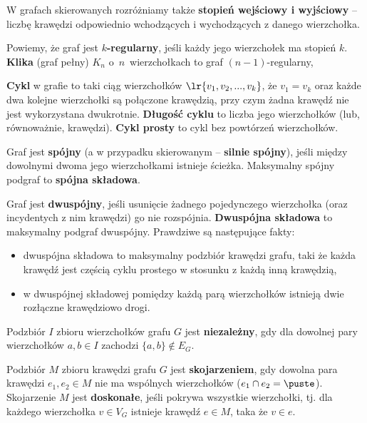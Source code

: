 W grafach skierowanych rozróżniamy także \textbf{stopień wejściowy i wyjściowy} -- liczbę krawędzi odpowiednio wchodzących i wychodzących z danego wierzchołka.

Powiemy, że graf jest \textbf{$k$-regularny}, jeśli każdy jego wierzchołek ma stopień $k$. \textbf{Klika} (graf pełny) $K_n$ o~$n$~wierzchołkach to graf $(n - 1)$-regularny,
\bigskip

\textbf{Cykl} w grafie to taki ciąg wierzchołków $\lr{v_1, v_2, ..., v_k}$, że $v_1 = v_k$ oraz każde dwa kolejne wierzchołki są połączone krawędzią, przy czym żadna krawędź nie jest wykorzystana dwukrotnie. \textbf{Długość cyklu} to liczba jego wierzchołków (lub, równoważnie, krawędzi). \textbf{Cykl prosty} to cykl bez powtórzeń wierzchołków.
\bigskip

Graf jest \textbf{spójny} (a w przypadku skierowanym -- \textbf{silnie spójny}), jeśli między dowolnymi dwoma jego wierzchołkami istnieje ścieżka. Maksymalny spójny podgraf to \textbf{spójna składowa}.

Graf jest \textbf{dwuspójny}, jeśli usunięcie żadnego pojedynczego wierzchołka (oraz incydentych z nim krawędzi) go nie rozspójnia. \textbf{Dwuspójna składowa} to maksymalny podgraf dwuspójny. Prawdziwe są następujące fakty:
\begin{itemize}
    \item dwuspójna składowa to maksymalny podzbiór krawędzi grafu, taki że każda krawędź jest częścią cyklu prostego w stosunku z każdą inną krawędzią,
    \item w dwuspójnej składowej pomiędzy każdą parą wierzchołków istnieją dwie rozłączne krawędziowo drogi.
\end{itemize}
\bigskip

Podzbiór $I$ zbioru wierzchołków grafu $G$ jest \textbf{niezależny}, gdy dla dowolnej pary wierzchołków $a, b \in I$ zachodzi $\{a, b\} \notin E_G$.

Podzbiór $M$ zbioru krawędzi grafu $G$ jest \textbf{skojarzeniem}, gdy dowolna para krawędzi $e_1, e_2 \in M$ nie ma wspólnych wierzchołków ($e_1 \cap e_2 = \puste$). Skojarzenie $M$ jest \textbf{doskonałe}, jeśli pokrywa wszystkie wierzchołki, tj. dla każdego wierzchołka $v \in V_G$ istnieje krawędź $e \in M$, taka że $v \in e$.

